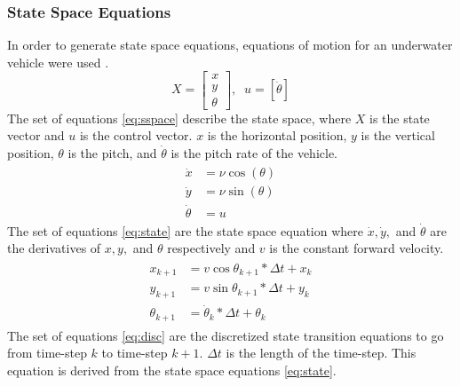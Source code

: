\subsubsection{State Space Equations}
In order to generate state space equations, equations of motion for an underwater vehicle were used \parencite{thor_kin}. 
\begin{equation}
    X=\left[ \begin{matrix} x\\ y\\ \theta \end{matrix} \right], \;\;
    u=\left[ \dot \theta \right]\label{eq:sspace}
\end{equation}
The set of equations \ref{eq:sspace} describe the state space, where $X$ is the state vector and $u$ is the control vector. $x$ is the horizontal position, $y$ is the vertical position, $\theta$ is the pitch, and $\dot \theta$ is the pitch rate of the vehicle. 
\begin{align}
    \begin{split}
        \dot x&=\nu \cos \left( \theta \right) \\
        \dot y&=\nu \sin \left( \theta \right) \\
        \dot \theta&=u
    \end{split} \label{eq:state}
\end{align}
The set of equations \ref{eq:state} are the state space equation where $\dot x, \dot y,$ and $\dot \theta$ are the derivatives of $x, y,$ and $ \theta$ respectively and $v$ is the constant forward velocity.
\begin{align}
    \begin{split}
        x_{k+1}&=v\cos \theta _{k+1}\ast \Delta t+x_{k} \\
        y_{k+1}&=v\sin \theta _{k+1}\ast \Delta t+y_{k} \\
        \theta _{k+1}&= \dot \theta _{k}\ast \Delta t+\theta _{k}
    \end{split}\label{eq:disc}
\end{align}
The set of equations \ref{eq:disc} are the discretized state transition equations to go from time-step $k$ to time-step $k+1$. $\Delta t$ is the length of the time-step. This equation is derived from the state space equations \ref{eq:state}.

